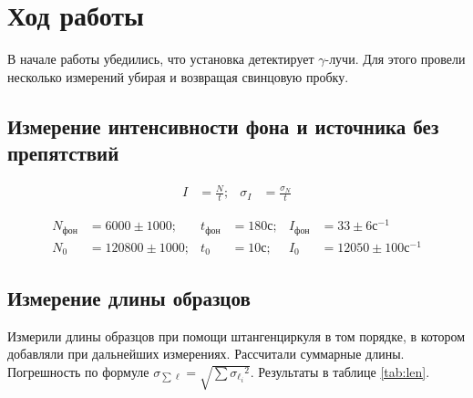 \documentclass[a4paper, 12pt]{article}
\begin{document}
    \section{Ход работы}

    В начале работы убедились, что установка детектирует $\gamma$-лучи. Для этого провели несколько измерений убирая и возвращая свинцовую пробку.

        \subsection{Измерение интенсивности фона и источника без препятствий}

            \begin{align*}
                I &= \frac{N}{t}; & \sigma_I &= \frac{\sigma_N}{t}
            \end{align*}

            \begin{align*}
                N_{фон} &= 6000 \pm 1000; & t_{фон} &= 180 с; & I_{фон} &= 33 \pm 6 с^{-1} \\
                N_0 &= 120800 \pm 1000; & t_0 &= 10 с; & I_0 &= 12050 \pm 100 с^{-1}
            \end{align*}

        \subsection{Измерение длины образцов}

            Измерили длины образцов при помощи штангенциркуля в том порядке, в котором добавляли при дальнейших измерениях. Рассчитали суммарные длины. Погрешность по формуле $\sigma_{\sum \ell} = \sqrt{\sum{\sigma_{\ell_i}}^2}$. Результаты в таблице \ref{tab:len}.
\end{document}
